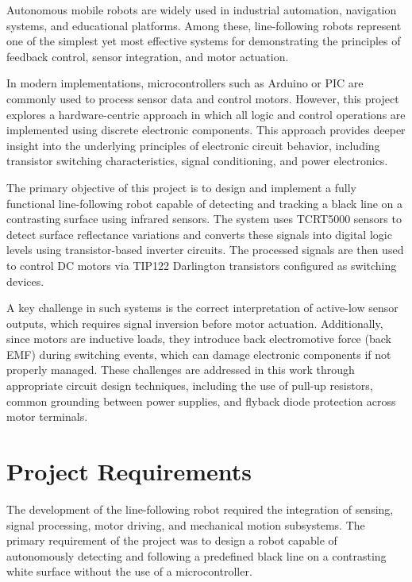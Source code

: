 \documentclass[conference]{IEEEtran}
\begin{document}
Autonomous mobile robots are widely used in industrial automation, navigation systems, and educational platforms. Among these, line-following robots represent one of the simplest yet most effective systems for demonstrating the principles of feedback control, sensor integration, and motor actuation.

In modern implementations, microcontrollers such as Arduino or PIC are commonly used to process sensor data and control motors. However, this project explores a hardware-centric approach in which all logic and control operations are implemented using discrete electronic components. This approach provides deeper insight into the underlying principles of electronic circuit behavior, including transistor switching characteristics, signal conditioning, and power electronics.

The primary objective of this project is to design and implement a fully functional line-following robot capable of detecting and tracking a black line on a contrasting surface using infrared sensors. The system uses TCRT5000 sensors to detect surface reflectance variations and converts these signals into digital logic levels using transistor-based inverter circuits. The processed signals are then used to control DC motors via TIP122 Darlington transistors configured as switching devices.

A key challenge in such systems is the correct interpretation of active-low sensor outputs, which requires signal inversion before motor actuation. Additionally, since motors are inductive loads, they introduce back electromotive force (back EMF) during switching events, which can damage electronic components if not properly managed. These challenges are addressed in this work through appropriate circuit design techniques, including the use of pull-up resistors, common grounding between power supplies, and flyback diode protection across motor terminals.

\section{Project Requirements}

The development of the line-following robot required the integration of sensing, signal processing, motor driving, and mechanical motion subsystems. The primary requirement of the project was to design a robot capable of autonomously detecting and following a predefined black line on a contrasting white surface without the use of a microcontroller.
\end{document}
